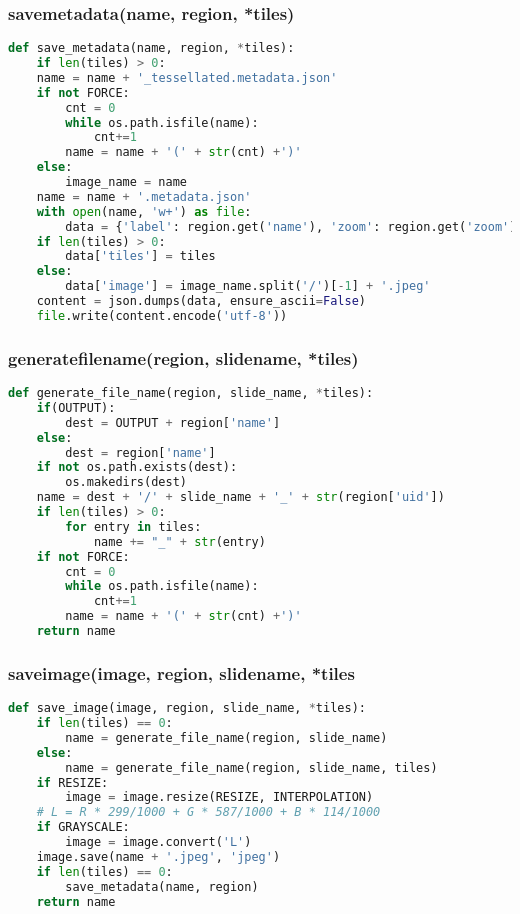 \subsubsection{save{\textunderscore}metadata(name, region, *tiles)}

\begin{lstlisting}[frame=single,language=python]
def save_metadata(name, region, *tiles):
	if len(tiles) > 0:
	name = name + '_tessellated.metadata.json'
	if not FORCE:
		cnt = 0
		while os.path.isfile(name):
			cnt+=1
		name = name + '(' + str(cnt) +')'
	else:
		image_name = name
	name = name + '.metadata.json'
	with open(name, 'w+') as file:
		data = {'label': region.get('name'), 'zoom': region.get('zoom'), 'context': region.get('context')}
	if len(tiles) > 0:
		data['tiles'] = tiles
	else:
		data['image'] = image_name.split('/')[-1] + '.jpeg'
	content = json.dumps(data, ensure_ascii=False)
	file.write(content.encode('utf-8'))
\end{lstlisting}


\subsubsection{generate{\textunderscore}file{\textunderscore}name(region, slide{\textunderscore}name, *tiles)}

\begin{lstlisting}[frame=single,language=python]
def generate_file_name(region, slide_name, *tiles):
	if(OUTPUT):
		dest = OUTPUT + region['name']
	else:
		dest = region['name']
	if not os.path.exists(dest):
		os.makedirs(dest)
	name = dest + '/' + slide_name + '_' + str(region['uid'])
	if len(tiles) > 0:
		for entry in tiles:
			name += "_" + str(entry)
	if not FORCE:
		cnt = 0
		while os.path.isfile(name):
			cnt+=1
		name = name + '(' + str(cnt) +')'
	return name
\end{lstlisting}


\subsubsection{save{\textunderscore}image(image, region, slide{\textunderscore}name, *tiles}

\begin{lstlisting}[frame=single,language=python]
def save_image(image, region, slide_name, *tiles):
	if len(tiles) == 0:
		name = generate_file_name(region, slide_name)
	else:
		name = generate_file_name(region, slide_name, tiles)
	if RESIZE:
		image = image.resize(RESIZE, INTERPOLATION)
	# L = R * 299/1000 + G * 587/1000 + B * 114/1000
	if GRAYSCALE:
		image = image.convert('L')
	image.save(name + '.jpeg', 'jpeg')
	if len(tiles) == 0:
		save_metadata(name, region)
	return name
\end{lstlisting}


